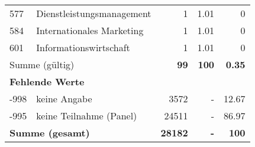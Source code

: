 \begin{longtable}{lXrrr}
        577 & \multicolumn{1}{X}{Dienstleistungsmanagement} & %
          \num{1} &
          \num[round-mode=places,round-precision=2]{1.01} &
          \num[round-mode=places,round-precision=2]{0} \\

        584 & \multicolumn{1}{X}{Internationales Marketing} & %
          \num{1} &
          \num[round-mode=places,round-precision=2]{1.01} &
          \num[round-mode=places,round-precision=2]{0} \\

        601 & \multicolumn{1}{X}{Informationswirtschaft} & %
          \num{1} &
          \num[round-mode=places,round-precision=2]{1.01} &
          \num[round-mode=places,round-precision=2]{0} \\

     \midrule
     \multicolumn{2}{l}{Summe (gültig)} &
       \textbf{\num{99}} &
     \textbf{\num{100}} &
       \textbf{\num[round-mode=places,round-precision=2]{0.35}} \\
     \multicolumn{5}{l}{\textbf{Fehlende Werte}}\\
       -998 &
       keine Angabe &
         \num{3572} &
        - &
         \num[round-mode=places,round-precision=2]{12.67} \\
       -995 &
       keine Teilnahme (Panel) &
         \num{24511} &
        - &
         \num[round-mode=places,round-precision=2]{86.97} \\
     \midrule
     \multicolumn{2}{l}{\textbf{Summe (gesamt)}} &
          \textbf{\num{28182}} &
        \textbf{-} &
        \textbf{\num{100}} \\
     \bottomrule
     \end{longtable}
     
